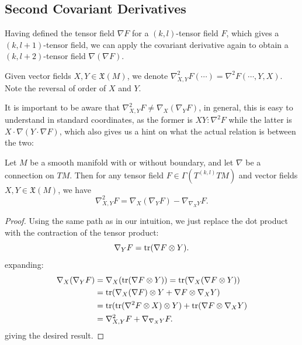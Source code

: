 \documentclass[../main.tex]{subfiles}
\begin{document}
\subsection{Second Covariant Derivatives}
Having defined the tensor field $\nabla F$ for a $(k,l)$-tensor field $F$, which gives a $(k,l+1)$-tensor field, we can apply the covariant derivative again to obtain a $(k,l+2)$-tensor field $\nabla(\nabla F)$.

Given vector fields $X, Y \in \mathfrak{X}(M)$, we denote $\nabla_{X,Y}^2 F( \cdots ) = \nabla^2 F(\cdots, Y, X)$. Note the reversal of order of $X$ and $Y$.

It is important to be aware that $\nabla_{X,Y}^2 F \neq \nabla_X(\nabla_Y F)$, in general, this is easy to understand in standard coordinates, as the former is $XY : \nabla^2 F$ while the latter is $X \cdot \nabla(Y \cdot \nabla F)$, which also gives us a hint on what the actual relation is between the two:
\begin{proposition}{}{}
	Let $M$ be a smooth manifold with or without boundary, and let $\nabla$ be a connection on $TM$. Then for any tensor field $F \in \Gamma(T^{(k, l)} TM)$ and vector fields $X, Y \in \mathfrak{X}(M)$, we have
	\begin{equation}
		\nabla_{X,Y}^2 F = \nabla_X(\nabla_Y F) - \nabla_{\nabla_X Y} F.
	\end{equation}
\end{proposition}
\begin{proof}
	Using the same path as in our intuition, we just replace the dot product with the contraction of the tensor product:
	\begin{equation*}
		\nabla_Y F = \operatorname{tr}(\nabla F \otimes Y).
	\end{equation*}
	expanding:
	\begin{equation*}
		\begin{aligned}
			\nabla_X(\nabla_Y F) &= \nabla_X(\operatorname{tr}(\nabla F \otimes Y)) = \operatorname{tr}(\nabla_X(\nabla F \otimes Y)) \\
													 &= \operatorname{tr}(\nabla_X(\nabla F) \otimes Y + \nabla F \otimes \nabla_X Y) \\
													 &= \operatorname{tr}(\operatorname{tr}(\nabla^2 F \otimes X) \otimes Y) + \operatorname{tr}(\nabla F \otimes \nabla_X Y) \\
													 &= \nabla_{X,Y}^2 F + \nabla_{\nabla_X Y} F.
		\end{aligned}
	\end{equation*}
	giving the desired result.
\end{proof}
\end{document}
